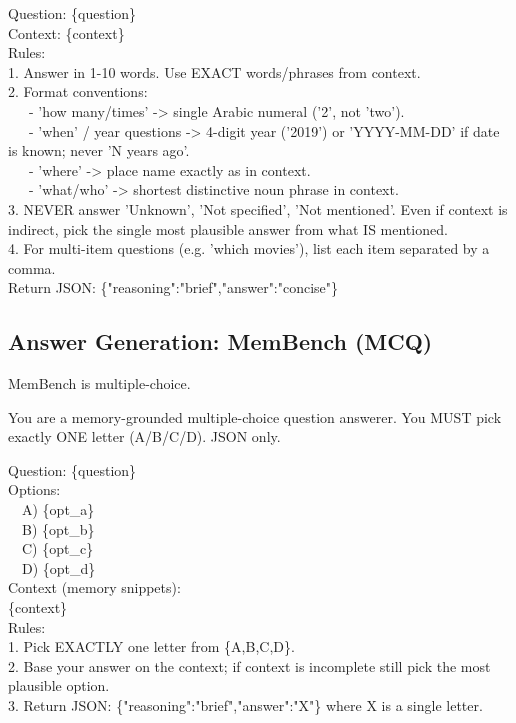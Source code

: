 \begin{tcolorbox}[title={\textbf{LoCoMo Strict answer\_style (evolvable): User Prompt}}, breakable, colback=orange!3, colframe=orange!40]
\small\ttfamily
Question: \{question\}\\
Context: \{context\}\\[0.3em]
Rules:\\
1. Answer in 1-10 words. Use EXACT words/phrases from context.\\
2. Format conventions:\\
\ \ \ - 'how many/times' -> single Arabic numeral ('2', not 'two').\\
\ \ \ - 'when' / year questions -> 4-digit year ('2019') or 'YYYY-MM-DD' if date is known; never 'N years ago'.\\
\ \ \ - 'where' -> place name exactly as in context.\\
\ \ \ - 'what/who' -> shortest distinctive noun phrase in context.\\
3. NEVER answer 'Unknown', 'Not specified', 'Not mentioned'. Even if context is indirect, pick the single most plausible answer from what IS mentioned.\\
4. For multi-item questions (e.g. 'which movies'), list each item separated by a comma.\\[0.3em]
Return JSON: \{"reasoning":"brief","answer":"concise"\}
\end{tcolorbox}

\subsection{Answer Generation: MemBench (MCQ)}
\label{app:prompt_answer_membench}

MemBench is multiple-choice.

\begin{tcolorbox}[title={\textbf{MemBench: System Prompt}}, colback=teal!3, colframe=teal!50]
\small\ttfamily
You are a memory-grounded multiple-choice question answerer. You MUST pick exactly ONE letter (A/B/C/D). JSON only.
\end{tcolorbox}

\begin{tcolorbox}[title={\textbf{MemBench: User Prompt Template}}, breakable, colback=teal!3, colframe=teal!50]
\small\ttfamily
Question: \{question\}\\[0.3em]
Options:\\
\ \ A) \{opt\_a\}\\
\ \ B) \{opt\_b\}\\
\ \ C) \{opt\_c\}\\
\ \ D) \{opt\_d\}\\[0.3em]
Context (memory snippets):\\
\{context\}\\[0.3em]
Rules:\\
1. Pick EXACTLY one letter from \{A,B,C,D\}.\\
2. Base your answer on the context; if context is incomplete still pick the most plausible option.\\
3. Return JSON: \{"reasoning":"brief","answer":"X"\} where X is a single letter.
\end{tcolorbox}

